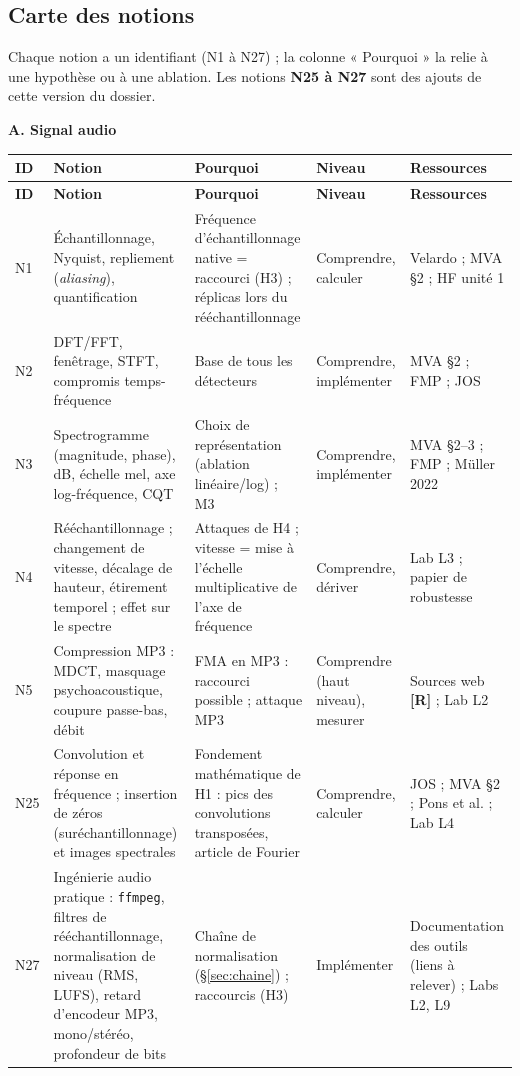 \documentclass[11pt,a4paper]{article}
\newcommand{\sR}{\textbf{[R]}}
\begin{document}
\subsection{Carte des notions}

Chaque notion a un identifiant (N1 à N27) ; la colonne « Pourquoi » la relie à une hypothèse ou à une ablation. Les notions \textbf{N25 à N27} sont des ajouts de cette version du dossier.

\textbf{A. Signal audio}

{\small
\begin{longtable}{L{0.9cm}L{3.7cm}L{4.6cm}L{2.3cm}L{3.1cm}}
\toprule
\textbf{ID} & \textbf{Notion} & \textbf{Pourquoi} & \textbf{Niveau} & \textbf{Ressources}\\
\midrule
\endfirsthead
\toprule
\textbf{ID} & \textbf{Notion} & \textbf{Pourquoi} & \textbf{Niveau} & \textbf{Ressources}\\
\midrule
\endhead
\bottomrule
\endfoot
N1 & Échantillonnage, Nyquist, repliement (\emph{aliasing}), quantification & Fréquence d'échantillonnage native = raccourci (H3) ; réplicas lors du rééchantillonnage & Comprendre, calculer & Velardo ; MVA \S2 ; HF unité 1\\
N2 & DFT/FFT, fenêtrage, STFT, compromis temps-fréquence & Base de tous les détecteurs & Comprendre, implémenter & MVA \S2 ; FMP ; JOS\\
N3 & Spectrogramme (magnitude, phase), dB, échelle mel, axe log-fréquence, CQT & Choix de représentation (ablation linéaire/log) ; M3 & Comprendre, implémenter & MVA \S2--3 ; FMP ; Müller 2022\\
N4 & Rééchantillonnage ; changement de vitesse, décalage de hauteur, étirement temporel ; effet sur le spectre & Attaques de H4 ; vitesse = mise à l'échelle multiplicative de l'axe de fréquence & Comprendre, dériver & Lab L3 ; papier de robustesse\\
N5 & Compression MP3 : MDCT, masquage psychoacoustique, coupure passe-bas, débit & FMA en MP3 : raccourci possible ; attaque MP3 & Comprendre (haut niveau), mesurer & Sources web \sR{} ; Lab L2\\
N25 & Convolution et réponse en fréquence ; insertion de zéros (suréchantillonnage) et images spectrales & Fondement mathématique de H1 : pics des convolutions transposées, article de Fourier & Comprendre, calculer & JOS ; MVA \S2 ; Pons et al. ; Lab L4\\
N27 & Ingénierie audio pratique : \texttt{ffmpeg}, filtres de rééchantillonnage, normalisation de niveau (RMS, LUFS), retard d'encodeur MP3, mono/stéréo, profondeur de bits & Chaîne de normalisation (\S\ref{sec:chaine}) ; raccourcis (H3) & Implémenter & Documentation des outils (liens à relever) ; Labs L2, L9\\
\end{longtable}
}
\end{document}
